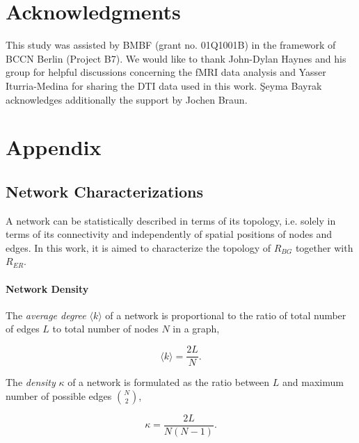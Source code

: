 \documentclass[fleqn,10pt]{wlpeerj}
\begin{document}
\section*{Acknowledgments}

This study was assisted by BMBF (grant no. 01Q1001B) in the framework of BCCN Berlin (Project B7). We would like to thank John-Dylan Haynes and his group for helpful discussions concerning the fMRI data analysis and Yasser Iturria-Medina for sharing the DTI data used in this work. \c{S}eyma Bayrak acknowledges additionally the support by Jochen Braun.







\newpage

\section*{Appendix}



\subsection*{Network Characterizations}

A network can be statistically described in terms of its topology, i.e. solely in terms of its connectivity and independently of spatial positions of nodes and edges. In this work, it is aimed to characterize the topology of $R_{BG}$ together with $R_{ER}$.   

\paragraph{Network Density}

The \textit{average degree} $\langle k \rangle$ of a network is proportional to the ratio of total number of edges $L$ to total number of nodes $N$ in a graph, 

\begin{equation}
\langle k \rangle = \frac{2L}{N}.
\end{equation}

The \textit{density} $\kappa$ of a network is formulated as the ratio between $L$ and maximum number of possible edges $\binom{N}{2}$,

\begin{equation}
\kappa = \frac{2L}{N(N-1)}.
\end{equation}	
\end{document}
